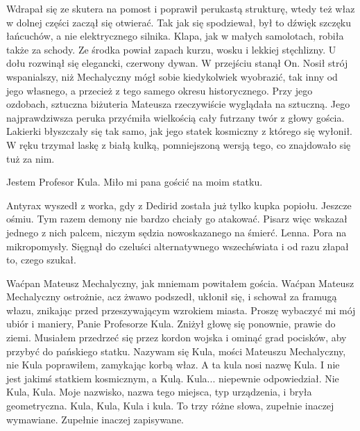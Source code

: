 Wdrapał się ze skutera na pomost i poprawił perukastą strukturę, wtedy też właz w dolnej części zaczął się otwierać.
Tak jak się spodziewał, był to dźwięk szczęku łańcuchów, a nie elektrycznego silnika. Klapa, jak w małych samolotach, robiła także za schody.
Ze środka powiał zapach kurzu, wosku i lekkiej stęchlizny.
U dołu rozwinął się elegancki, czerwony dywan.
W przejściu stanął On.
Nosił strój wspanialszy, niż Mechalyczny mógł sobie kiedykolwiek wyobrazić, tak inny od jego własnego, a przecież z tego samego okresu historycznego.
Przy jego ozdobach, sztuczna biżuteria Mateusza rzeczywiście wyglądała na sztuczną.
Jego najprawdziwsza peruka przyćmiła wielkością cały futrzany twór z głowy gościa.
Lakierki błyszczały się tak samo, jak jego statek kosmiczny z którego się wyłonił.
W ręku trzymał laskę z białą kulką, pomniejszoną wersją tego, co znajdowało się tuż za nim.

\begin{dialogue}
\ds{} Jestem Profesor Kula. Miło mi pana gościć na moim statku.
\end{dialogue}

\divider{}

Antyrax wyszedł z worka, gdy z Dedirid została już tylko kupka popiołu.
Jeszcze ośmiu.
Tym razem demony nie bardzo chciały go atakować.
Pisarz więc wskazał jednego z nich palcem, niczym sędzia nowoskazanego na śmierć.
Lenna. Pora na mikropomysły.
Sięgnął do czeluści alternatywnego wszechświata i od razu złapał to, czego szukał.

\divider{}

\begin{dialogue}
\ds{} Waćpan Mateusz Mechalyczny, jak mniemam \dm{} powitałem gościa. Waćpan Mateusz Mechalyczny ostrożnie, acz żwawo podszedł, ukłonił się, i schował za framugą włazu,
znikając przed przeszywającym wzrokiem miasta.
\ds{} Proszę wybaczyć mi mój ubiór i maniery, Panie Profesorze Kula. \dm{} Zniżył głowę się ponownie, prawie do ziemi. \dm{}
Musiałem przedrzeć się przez kordon wojska i ominąć grad pocisków, aby przybyć do pańskiego statku.
\ds{} Nazywam się Kula, mości Mateuszu Mechalyczny, nie Kula \dm{} poprawiłem, zamykając korbą właz. \dm{} A ta kula nosi nazwę Kula. 
I nie jest jakimś statkiem kosmicznym, a Kulą.
\ds{} Kula... \dm{} niepewnie odpowiedział.
\ds{} Nie Kula, Kula. Moje nazwisko, nazwa tego miejsca, typ urządzenia, i bryła geometryczna. Kula, Kula, Kula i kula. To trzy różne słowa, zupełnie inaczej wymawiane.
Zupełnie inaczej zapisywane.
\end{dialogue}

